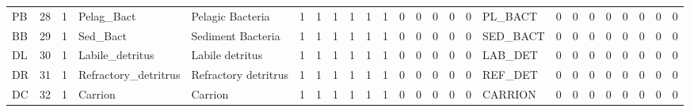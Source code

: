 \documentclass[11pt]{article}
\begin{document}
\begin{table}[htb]
\begin{center}
\begin{tabular}{lrrllrrrrrrrrrrrlrrrrrrrr}
 PB    &     28  &           1  &  Pelag_Bact            &  Pelagic Bacteria      &           1  &             1  &          1  &          1  &                1  &          1  &                0  &                  0  &         0  &           0  &      0  &  PL_BACT       &           0  &        0  &             0  &           0  &              0  &             0  &           0  &            0  \\
 BB    &     29  &           1  &  Sed_Bact              &  Sediment Bacteria     &           1  &             1  &          1  &          1  &                1  &          1  &                0  &                  0  &         0  &           0  &      0  &  SED_BACT      &           0  &        0  &             0  &           0  &              0  &             0  &           0  &            0  \\
 DL    &     30  &           1  &  Labile_detritus       &  Labile detritus       &           1  &             1  &          1  &          1  &                1  &          1  &                0  &                  0  &         0  &           0  &      0  &  LAB_DET       &           0  &        0  &             0  &           0  &              0  &             0  &           0  &            0  \\
 DR    &     31  &           1  &  Refractory_detritrus  &  Refractory detritrus  &           1  &             1  &          1  &          1  &                1  &          1  &                0  &                  0  &         0  &           0  &      0  &  REF_DET       &           0  &        0  &             0  &           0  &              0  &             0  &           0  &            0  \\
 DC    &     32  &           1  &  Carrion               &  Carrion               &           1  &             1  &          1  &          1  &                1  &          1  &                0  &                  0  &         0  &           0  &      0  &  CARRION       &           0  &        0  &             0  &           0  &              0  &             0  &           0  &            0  \\
\end{tabular}
\end{center}
\end{table}
\end{document}
